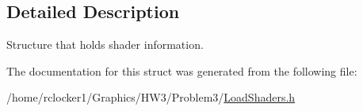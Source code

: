 \subsection{Detailed Description}
Structure that holds shader information. 

The documentation for this struct was generated from the following file\+:\begin{DoxyCompactItemize}
\item 
/home/rclocker1/\+Graphics/\+H\+W3/\+Problem3/\hyperlink{_load_shaders_8h}{Load\+Shaders.\+h}\end{DoxyCompactItemize}
